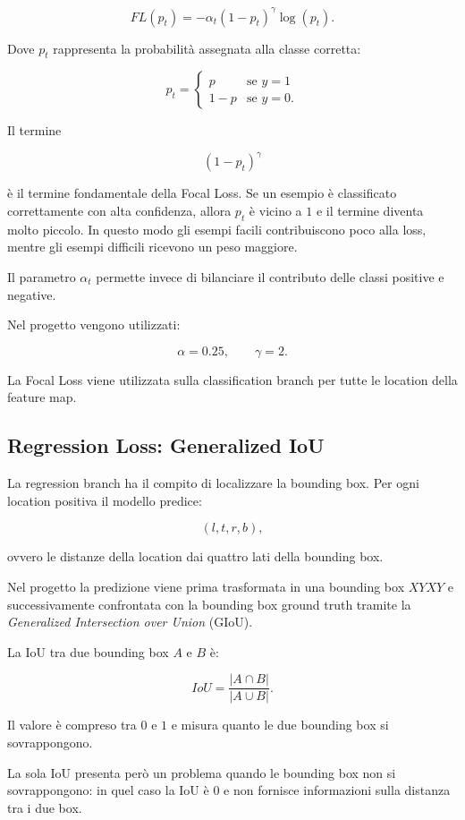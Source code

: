 \[
FL(p_t)
=
-\alpha_t(1-p_t)^\gamma\log(p_t).
\]

Dove $p_t$ rappresenta la probabilità assegnata alla classe corretta:

\[
p_t=
\begin{cases}
p & \text{se } y=1\\
1-p & \text{se } y=0.
\end{cases}
\]

Il termine

\[
(1-p_t)^\gamma
\]

è il termine fondamentale della Focal Loss. Se un esempio è classificato
correttamente con alta confidenza, allora $p_t$ è vicino a $1$ e il termine
diventa molto piccolo. In questo modo gli esempi facili contribuiscono poco alla
loss, mentre gli esempi difficili ricevono un peso maggiore.

Il parametro $\alpha_t$ permette invece di bilanciare il contributo delle
classi positive e negative.

Nel progetto vengono utilizzati:

\[
\alpha=0.25,\qquad\gamma=2.
\]

La Focal Loss viene utilizzata sulla classification branch per tutte le
location della feature map.

\subsection{Regression Loss: Generalized IoU}

La regression branch ha il compito di localizzare la bounding box. Per ogni
location positiva il modello predice:

\[
(l,t,r,b),
\]

ovvero le distanze della location dai quattro lati della bounding box.

Nel progetto la predizione viene prima trasformata in una bounding box
$XYXY$ e successivamente confrontata con la bounding box ground truth tramite
la \textit{Generalized Intersection over Union} (GIoU).

La IoU tra due bounding box $A$ e $B$ è:

\[
IoU =
\frac{|A\cap B|}
{|A\cup B|}.
\]

Il valore è compreso tra $0$ e $1$ e misura quanto le due bounding box
si sovrappongono.

La sola IoU presenta però un problema quando le bounding box non si
sovrappongono: in quel caso la IoU è $0$ e non fornisce informazioni sulla
distanza tra i due box.

